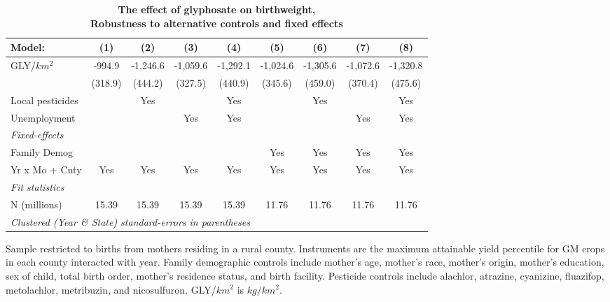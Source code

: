 \begin{table}[htbp]
   \centering
   \small
   \begin{threeparttable}[b]
      \caption{\label{tab:robust-cntrl-dbwt-allyielddiffpercentilegmomax} \textbf{The effect of glyphosate on birthweight, \\ Robustness to alternative controls and fixed effects}}
      \begin{tabular}{lcccccccc}
         \toprule
         Model:           & (1)     & (2)      & (3)      & (4)      & (5)      & (6)      & (7)      & (8)\\  
         \midrule 
         GLY/$km^2$       & -994.9  & -1,246.6 & -1,059.6 & -1,292.1 & -1,024.6 & -1,305.6 & -1,072.6 & -1,320.8\\   
                          & (318.9) & (444.2)  & (327.5)  & (440.9)  & (345.6)  & (459.0)  & (370.4)  & (475.6)\\   
         Local pesticides &         & Yes      &          & Yes      &          & Yes      &          & Yes\\  
         Unemployment     &         &          & Yes      & Yes      &          &          & Yes      & Yes\\  
         \midrule
         \emph{Fixed-effects}\\
         Family Demog     &         &          &          &          & Yes      & Yes      & Yes      & Yes\\  
         Yr x Mo + Cnty   & Yes     & Yes      & Yes      & Yes      & Yes      & Yes      & Yes      & Yes\\  
         \midrule
         \emph{Fit statistics}\\
         N (millions)     & 15.39   & 15.39    & 15.39    & 15.39    & 11.76    & 11.76    & 11.76    & 11.76\\  
         \midrule
         \multicolumn{9}{l}{\emph{Clustered (Year \& State) standard-errors in parentheses}}\\
      \end{tabular}
      
      \begin{tablenotes}\item Sample restricted to births from mothers residing in a rural county. Instruments are the maximum attainable yield percentile for GM crops in each county interacted with year. Family demographic controls include mother's age, mother's race, mother's origin, mother's education, sex of child, total birth order, mother's residence status, and birth facility. Pesticide controls include alachlor, atrazine, cyanizine, fluazifop, metolachlor, metribuzin, and nicosulfuron. GLY/$km^2$ is $kg/km^2$.
      \end{tablenotes}
   \end{threeparttable}
\end{table}
